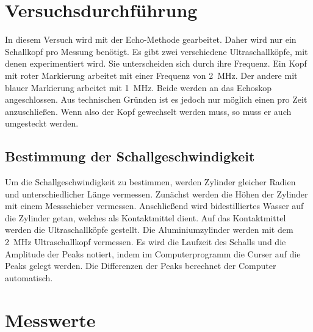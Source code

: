 


\section{Versuchsdurchführung}

In diesem Versuch wird mit der Echo-Methode gearbeitet. Daher wird nur ein Schallkopf pro Messung benötigt.
Es gibt zwei verschiedene Ultraschallköpfe, mit denen experimentiert wird. Sie unterscheiden sich durch 
ihre Frequenz. Ein Kopf mit roter Markierung arbeitet mit einer Frequenz von \qty{2}{\mega \hertz}. Der 
andere mit blauer Markierung arbeitet mit \qty{1}{\mega \hertz}. Beide werden an das Echoskop angeschlossen.
Aus technischen Gründen ist es jedoch nur möglich einen pro Zeit anzuschließen. Wenn also der Kopf gewechselt 
werden muss, so muss er auch umgesteckt werden.

\subsection{Bestimmung der Schallgeschwindigkeit}

\noindent Um die Schallgeschwindigkeit zu bestimmen, werden Zylinder gleicher Radien und unterschiedlicher 
Länge vermessen. Zunächst werden die Höhen der Zylinder mit einem Messschieber vermessen.
Anschließend wird bidestilliertes Wasser auf die Zylinder getan, welches als Kontaktmittel dient. 
Auf das Kontaktmittel werden die Ultraschallköpfe gestellt. 
Die Aluminiumzylinder werden mit dem \qty{2}{\mega \hertz} Ultraschallkopf vermessen. Es wird die Laufzeit 
des Schalls und die Amplitude der Peaks notiert, indem im Computerprogramm die Curser auf die Peaks gelegt werden.
Die Differenzen der Peaks berechnet der Computer automatisch.   




\section{Messwerte}



